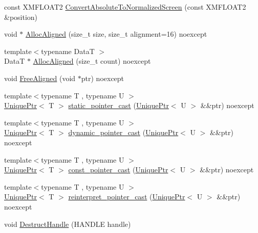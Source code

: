 \begin{DoxyCompactItemize}
\item 
const X\+M\+F\+L\+O\+A\+T2 \hyperlink{namespacemage_a9ef1aad29d7631ee2d88467faca6cc56}{Convert\+Absolute\+To\+Normalized\+Screen} (const X\+M\+F\+L\+O\+A\+T2 \&position)
\item 
void $\ast$ \hyperlink{namespacemage_acf382fe2a862dbe025e523c398760145}{Alloc\+Aligned} (size\+\_\+t size, size\+\_\+t alignment=16) noexcept
\item 
{\footnotesize template$<$typename DataT $>$ }\\DataT $\ast$ \hyperlink{namespacemage_a99a1bea696ddb7fdbf981edfa6e3cf30}{Alloc\+Aligned} (size\+\_\+t count) noexcept
\item 
void \hyperlink{namespacemage_a2ea8b0ebc056a664eadff3512c1cade4}{Free\+Aligned} (void $\ast$ptr) noexcept
\item 
{\footnotesize template$<$typename T , typename U $>$ }\\\hyperlink{namespacemage_a8c307fbcc33bce9b7f2aa4c26c3b95cf}{Unique\+Ptr}$<$ T $>$ \hyperlink{namespacemage_a9ca7c72e9d605611f79c9e6d40ed614f}{static\+\_\+pointer\+\_\+cast} (\hyperlink{namespacemage_a8c307fbcc33bce9b7f2aa4c26c3b95cf}{Unique\+Ptr}$<$ U $>$ \&\&ptr) noexcept
\item 
{\footnotesize template$<$typename T , typename U $>$ }\\\hyperlink{namespacemage_a8c307fbcc33bce9b7f2aa4c26c3b95cf}{Unique\+Ptr}$<$ T $>$ \hyperlink{namespacemage_ae79d9f43e3d7f767b0ee86ce13be90b5}{dynamic\+\_\+pointer\+\_\+cast} (\hyperlink{namespacemage_a8c307fbcc33bce9b7f2aa4c26c3b95cf}{Unique\+Ptr}$<$ U $>$ \&\&ptr) noexcept
\item 
{\footnotesize template$<$typename T , typename U $>$ }\\\hyperlink{namespacemage_a8c307fbcc33bce9b7f2aa4c26c3b95cf}{Unique\+Ptr}$<$ T $>$ \hyperlink{namespacemage_a7770985fc2e4f7e88c51471e1af0980b}{const\+\_\+pointer\+\_\+cast} (\hyperlink{namespacemage_a8c307fbcc33bce9b7f2aa4c26c3b95cf}{Unique\+Ptr}$<$ U $>$ \&\&ptr) noexcept
\item 
{\footnotesize template$<$typename T , typename U $>$ }\\\hyperlink{namespacemage_a8c307fbcc33bce9b7f2aa4c26c3b95cf}{Unique\+Ptr}$<$ T $>$ \hyperlink{namespacemage_a874d70e47944b8e322522731a0549911}{reinterpret\+\_\+pointer\+\_\+cast} (\hyperlink{namespacemage_a8c307fbcc33bce9b7f2aa4c26c3b95cf}{Unique\+Ptr}$<$ U $>$ \&\&ptr) noexcept
\item 
void \hyperlink{namespacemage_a7bf12816896ea8d126d397f0c6d571b1}{Destruct\+Handle} (H\+A\+N\+D\+LE handle)

\end{DoxyCompactItemize}
